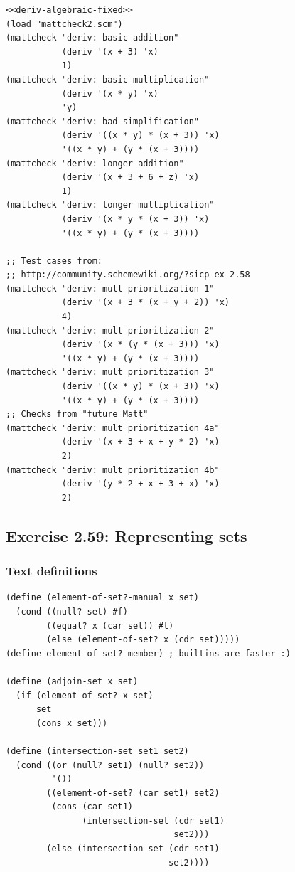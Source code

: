 \documentclass[final,fleqn,titlepage,twoside]{article}
\begin{document}
\begin{verbatim}
<<deriv-algebraic-fixed>>
(load "mattcheck2.scm")
(mattcheck "deriv: basic addition"
           (deriv '(x + 3) 'x)
           1)
(mattcheck "deriv: basic multiplication"
           (deriv '(x * y) 'x)
           'y)
(mattcheck "deriv: bad simplification"
           (deriv '((x * y) * (x + 3)) 'x)
           '((x * y) + (y * (x + 3))))
(mattcheck "deriv: longer addition"
           (deriv '(x + 3 + 6 + z) 'x)
           1)
(mattcheck "deriv: longer multiplication"
           (deriv '(x * y * (x + 3)) 'x)
           '((x * y) + (y * (x + 3))))

;; Test cases from:
;; http://community.schemewiki.org/?sicp-ex-2.58
(mattcheck "deriv: mult prioritization 1"
           (deriv '(x + 3 * (x + y + 2)) 'x)
           4)
(mattcheck "deriv: mult prioritization 2"
           (deriv '(x * (y * (x + 3))) 'x)
           '((x * y) + (y * (x + 3))))
(mattcheck "deriv: mult prioritization 3"
           (deriv '((x * y) * (x + 3)) 'x)
           '((x * y) + (y * (x + 3))))
;; Checks from "future Matt"
(mattcheck "deriv: mult prioritization 4a"
           (deriv '(x + 3 + x + y * 2) 'x)
           2)
(mattcheck "deriv: mult prioritization 4b"
           (deriv '(y * 2 + x + 3 + x) 'x)
           2)
\end{verbatim}

\subsection{Exercise 2.59: Representing sets}
\label{sec:org6345454}
\subsubsection{Text definitions}
\label{sec:orgf2c96c0}
\begin{verbatim}
(define (element-of-set?-manual x set)
  (cond ((null? set) #f)
        ((equal? x (car set)) #t)
        (else (element-of-set? x (cdr set)))))
(define element-of-set? member) ; builtins are faster :)

(define (adjoin-set x set)
  (if (element-of-set? x set)
      set
      (cons x set)))

(define (intersection-set set1 set2)
  (cond ((or (null? set1) (null? set2)) 
         '())
        ((element-of-set? (car set1) set2)
         (cons (car set1)
               (intersection-set (cdr set1) 
                                 set2)))
        (else (intersection-set (cdr set1) 
                                set2))))
\end{verbatim}
\end{document}
